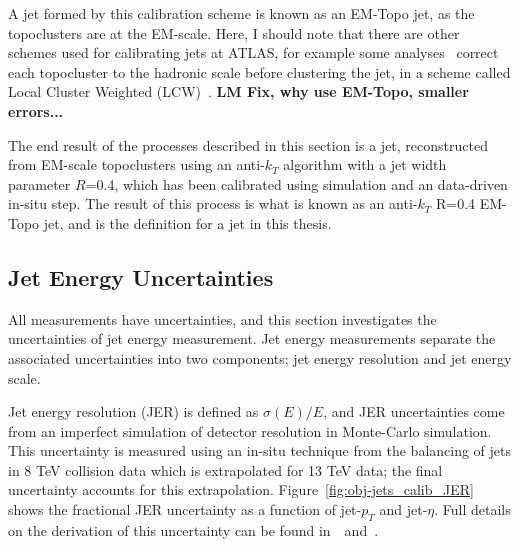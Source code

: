A jet formed by this calibration scheme is known as an EM-Topo jet, as the topoclusters are at the EM-scale.
Here, I should note that there are other schemes used for calibrating jets at ATLAS,
for example some analyses~\cite{obj-VVjj} correct each topocluster to the hadronic scale
before clustering the jet, in a scheme called Local Cluster Weighted (LCW)~\cite{obj-jets_topo}.
\textbf{LM Fix, why use EM-Topo, smaller errors...}

The end result of the processes described in this section is a jet,
reconstructed from EM-scale topoclusters using an anti-$k_T$ algorithm with a jet width parameter $R$=0.4,
which has been calibrated using simulation and an data-driven in-situ step.
The result of this process is what is known as an anti-$k_T$ R=0.4 EM-Topo jet,
and is the definition for a jet in this thesis.

\subsection{Jet Energy Uncertainties}
\label{sec:obj-jets_uncert}

All measurements have uncertainties, and this section investigates the uncertainties of jet energy measurement.
Jet energy measurements separate the associated uncertainties into two components;
jet energy resolution and jet energy scale.

Jet energy resolution (JER) is defined as $\sigma(E)/E$, and JER uncertainties
come from an imperfect simulation of detector resolution in Monte-Carlo simulation.
This uncertainty is measured using an in-situ technique from the balancing of jets in 8 TeV collision data
which is extrapolated for 13 TeV data; the final uncertainty accounts for this extrapolation.
Figure~\ref{fig:obj-jets_calib_JER} shows the fractional JER uncertainty as a function of jet-$p_T$ and jet-$\eta$.
Full details on the derivation of this uncertainty can be found in~\cite{obj-jets_calib_2015}~and~\cite{obj-jets_calib_JER_8TeV}.

